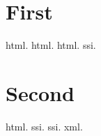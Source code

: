 \documentclass[12pt]{scrreport}
\begin{document}
\chapter{First} \gls{html}. \gls{html}. \gls{html}. \gls{ssi}. 

\chapter{Second} \gls{html}. \gls{ssi}. \gls{ssi}. \gls{xml}. 

\renewcommand*{\printunsrtglossaryentryprocesshook}[1]{%
 \glsxtrifhasfield*{location}{#1}{}{\printunsrtglossaryskipentry}%
}
\printunsrtglossaries 
\end{document}
